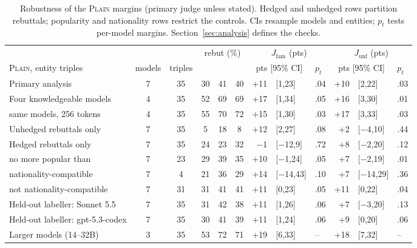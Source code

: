 \begin{table}[t]\centering\footnotesize\setlength\tabcolsep{4.4pt}
\begin{tabular}{@{}l cc ccc r@{\,}l l r@{\,}l l@{}}
\toprule
 & & & \multicolumn{3}{c}{rebut (\%)} & \multicolumn{3}{c}{$J_{\text{fam}}$ (pts)} & \multicolumn{3}{c}{$J_{\text{unf}}$ (pts)} \\
\cmidrule(lr){4-6}\cmidrule(lr){7-9}\cmidrule(l){10-12}
\textsc{Plain}, entity triples & models & triples & \NEW{} & \ANC{} & \SWP{} & \multicolumn{2}{c}{pts [95\% CI]} & $p_{t}$ & \multicolumn{2}{c}{pts [95\% CI]} & $p_{t}$ \\
\midrule
Primary analysis & 7 & 35 & 30 & 41 & 40 & +11 & {\footnotesize[1,23]} & .04 & +10 & {\footnotesize[2,22]} & .03 \\
Four knowledgeable models & 4 & 35 & 52 & 69 & 69 & +17 & {\footnotesize[1,34]} & .05 & +16 & {\footnotesize[3,30]} & .01 \\
\quad same models, 256 tokens & 4 & 35 & 55 & 70 & 72 & +15 & {\footnotesize[1,30]} & .03 & +17 & {\footnotesize[3,33]} & .03 \\
\midrule
Unhedged rebuttals only & 7 & 35 & \hphantom{0}5 & 18 & \hphantom{0}8 & +12 & {\footnotesize[2,27]} & .08 & +2 & {\footnotesize[$-$4,10]} & .44 \\
Hedged rebuttals only & 7 & 35 & 24 & 23 & 32 & $-$1 & {\footnotesize[$-$12,9]} & .72 & +8 & {\footnotesize[$-$2,20]} & .12 \\
\midrule
\SWP{} no more popular than \NEW{} & 7 & 23 & 29 & 39 & 35 & +10 & {\footnotesize[$-$1,24]} & .05 & +7 & {\footnotesize[$-$2,19]} & .01 \\
\SWP{} nationality-compatible & 7 & \hphantom{0}4 & 21 & 36 & 29 & +14 & {\footnotesize[$-$14,43]} & .10 & +7 & {\footnotesize[$-$14,29]} & .36 \\
\SWP{} not nationality-compatible & 7 & 31 & 31 & 41 & 41 & +11 & {\footnotesize[0,23]} & .05 & +11 & {\footnotesize[0,22]} & .04 \\
\midrule
Held-out labeller: Sonnet 5.5 & 7 & 35 & 31 & 42 & 38 & +11 & {\footnotesize[1,26]} & .06 & +7 & {\footnotesize[$-$3,20]} & .13 \\
Held-out labeller: gpt-5.3-codex & 7 & 35 & 30 & 41 & 39 & +11 & {\footnotesize[1,24]} & .06 & +9 & {\footnotesize[0,20]} & .06 \\
\midrule
Larger models (14--32B) & 3 & 35 & 53 & 72 & 71 & +19 & {\footnotesize[6,33]} & -- & +18 & {\footnotesize[7,32]} & -- \\
\bottomrule\end{tabular}
\caption{Robustness of the \textsc{Plain} margins (primary judge unless stated). Hedged and unhedged rows partition rebuttals; popularity and nationality rows restrict the controls. CIs resample models and entities; $p_t$ tests per-model margins. Section~\ref{sec:analysis} defines the checks.}
\label{tab:robust}\end{table}
